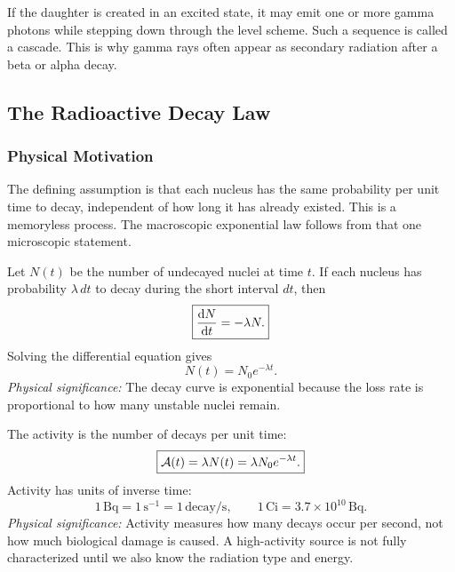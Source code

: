 If the daughter is created in an excited state, it may emit one or more gamma
photons while stepping down through the level scheme.  Such a sequence is called
a cascade.  This is why gamma rays often appear as secondary radiation after a
beta or alpha decay.

\subsection{The Radioactive Decay Law}
\label{subsec:lec05:decay_law}

\subsubsection*{Physical Motivation}
The defining assumption is that each nucleus has the same probability per unit
time to decay, independent of how long it has already existed.  This is a
memoryless process.  The macroscopic exponential law follows from that one
microscopic statement.

Let \(N(t)\) be the number of undecayed nuclei at time \(t\).  If each nucleus
has probability \(\lambda\,dt\) to decay during the short interval \(dt\), then
\begin{equation}
  \label{eq:lec05:decay_differential}
  \boxed{\dv{N}{t}=-\lambda N.}
\end{equation}
Solving the differential equation gives
\begin{equation}
  \label{eq:lec05:decay_solution}
  \boxed{N(t)=N_0 e^{-\lambda t}.}
\end{equation}
\textit{Physical significance:} The decay curve is exponential because the
loss rate is proportional to how many unstable nuclei remain.

The activity is the number of decays per unit time:
\begin{equation}
  \label{eq:lec05:activity_definition}
  \boxed{\mathcal{A}(t)=\lambda N(t)=\lambda N_0e^{-\lambda t}.}
\end{equation}
Activity has units of inverse time:
\begin{equation}
  \label{eq:lec05:activity_units}
  \boxed{1\,\mathrm{Bq}=1\,\mathrm{s}^{-1}=1\,\mathrm{decay/s},\qquad
  1\,\mathrm{Ci}=3.7\times10^{10}\,\mathrm{Bq}.}
\end{equation}
\textit{Physical significance:} Activity measures how many decays occur per
second, not how much biological damage is caused.  A high-activity source is
not fully characterized until we also know the radiation type and energy.

